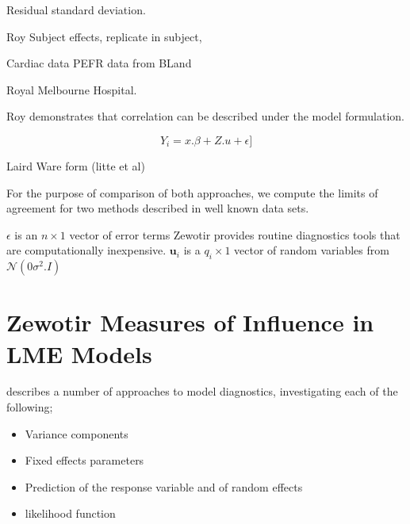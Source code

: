 \documentclass[12pt, a4paper]{article}
\begin{document}
\bigskip 

Residual standard deviation.

Roy Subject effects, replicate in subject,

Cardiac data PEFR data from BLand


Royal Melbourne Hospital.


Roy demonstrates that correlation can be described under the model formulation.

\[Y_i = x.\beta + Z.u + \epsilon]\]


Laird Ware form (litte et al)




For the purpose of comparison of both approaches, we compute the limits of agreement for two methods described in 
well known data sets.


$\epsilon$ is an $n \times 1$ vector of error terms
Zewotir provides routine diagnostics tools that are computationally inexpensive.
$\boldsymbol{u}_i$ is a $q_i \times 1$  vector of random variables from $\mathcal{N}(0 \sigma^2.I)$







\section{Zewotir Measures of Influence in LME Models}%
\citet{Zewotir} describes a number of approaches to model diagnostics, investigating each of the following;
\begin{itemize}
	\item Variance components
	\item Fixed effects parameters
	\item Prediction of the response variable and of random effects
	\item likelihood function
\end{itemize}
\end{document}
